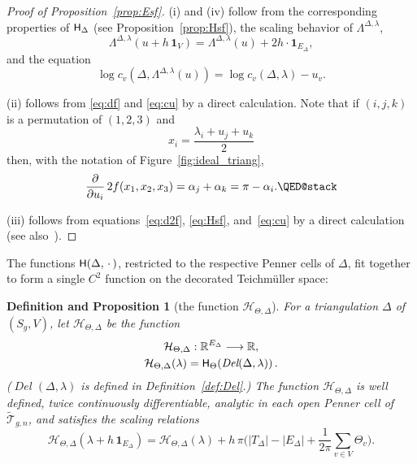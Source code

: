 \documentclass[a4paper, 11pt]{article}
\newcommand{\R}{\mathbb{R}}
\newcommand{\Teich}{\mathcal{T}}
\newcommand{\decTeich}{\widetilde{\Teich}}
\newcommand{\Tm}{Teich\-m{\"u}l\-ler}
\newcommand{\Del}{\operatorname{\textit{Del}}}
\newcommand{\Hcal}{\mathcal{H}}
\newcommand{\Hsf}{\scalebox{0.94}{$\mathsf{H}$}}
\theoremstyle{plain}
\newtheorem{defprop}[theorem]{Definition and Proposition}
\theoremstyle{definition}
\begin{document}
\begin{proof}[Proof of Proposition~\ref{prop:Esf}]
  (i) and (iv) follow from the corresponding properties of
  $\Hsf_{\Delta}$ (see Proposition~\ref{prop:Hsf}), the scaling behavior
  of $\Lambda^{\Delta,\lambda}$,
  \begin{equation}
    \label{eq:Lambdascale}
    \Lambda^{\Delta,\lambda}(u+h\,\mathbf{1}_{V})=
    \Lambda^{\Delta,\lambda}(u)+2h\cdot \mathbf{1}_{E_{\Delta}},
  \end{equation}
  and the equation
  \begin{equation}
    \label{eq:cu}
    \log c_{v}(\Delta,\Lambda^{\Delta,\lambda}(u))
    =\log c_{v}(\Delta,\lambda)-u_{v}.
  \end{equation}
  
  (ii) follows from \eqref{eq:df} and \eqref{eq:cu} by a direct
  calculation. Note that if $(i,j,k)$ is a permutation of $(1,2,3)$
  and
  \begin{equation*}
    x_{i}=\frac{\lambda_{i}+u_{j}+u_{k}}{2}
  \end{equation*}
  then, with the notation of Figure~\ref{fig:ideal_triang},
  \begin{equation}
    \label{eq:dfdu}
    \frac{\partial}{\partial u_{i}}\,
    2f(x_{1},x_{2},x_{3})
    =\alpha_{j}+\alpha_{k}=\pi-\alpha_{i}.\qedhere
  \end{equation}

  (iii) follows from equations~\eqref{eq:d2f}, \eqref{eq:Hsf},
  and~\eqref{eq:cu} by a direct calculation (see
  also~\cite[Prop.~4.1.6]{bobenko15}).
\end{proof}

The functions $\Hsf(\Delta,\,\cdot\,)$, restricted to the respective
Penner cells of $\Delta$, fit together to form a single
$C^{2}$ function on the decorated \Tm{} space:

\begin{defprop}[the function $\Hcal_{\Theta,\Delta}$]
  \label{defprop:Hcal}
  For a triangulation $\Delta$ of $(S_{g},V)$, let
  $\Hcal_{\Theta,\Delta}$ be the function
  \begin{gather}
    \notag
    \Hcal_{\Theta,\Delta}:\R^{E_{\Delta}}\longrightarrow\R,\\
    \Hcal_{\Theta,\Delta}(\lambda)=\Hsf_{\Theta}(\Del(\Delta,\lambda))
    \label{eq:Hcal}\,.
  \end{gather}
  ($\Del(\Delta,\lambda)$ is defined in Definition~\ref{def:Del}.)
  The function $\Hcal_{\Theta,\Delta}$ is well defined, twice
  continuously differentiable, analytic in each open Penner cell of
  $\decTeich_{g,n}$, and satisfies the scaling relations
  \begin{equation}
    \label{eq:Hcalscale}
    \Hcal_{\Theta,\Delta}(\lambda+h\,\mathbf{1}_{E_{\Delta}})
    =\Hcal_{\Theta,\Delta}(\lambda)
    +h\,\pi
    \Big(
    |T_{\Delta}|-|E_{\Delta}|+\frac{1}{2\pi}\sum_{v\in V}\Theta_{v}
    \Big).
  \end{equation}
\end{defprop}
\end{document}
